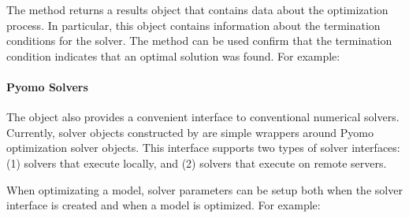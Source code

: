 \documentclass[letterpaper,10pt,english]{sphinxmanual}
\begin{document}
The  method returns a results object that contains
data about the optimization process.  In particular, this object
contains information about the termination conditions for the solver.
The  method can be used confirm that the
termination condition indicates that an optimal solution was found.  For example:

\begin{sphinxVerbatim}[commandchars=\\\{\}]
   
   
  
\end{sphinxVerbatim}


\paragraph{Pyomo Solvers}
\label{\detokenize{solvers:pyomo-solvers}}
The  object also provides a convenient interface to
conventional numerical solvers.  Currently, solver objects constructed
by  are simple wrappers around Pyomo optimization
solver objects.  This interface supports two types of solver
interfaces: (1) solvers that execute locally, and (2) solvers that execute
on remote servers.

When optimizating a  model, solver parameters can be setup
both when the solver interface is created and when a model is optimized.
For example:
\end{document}
